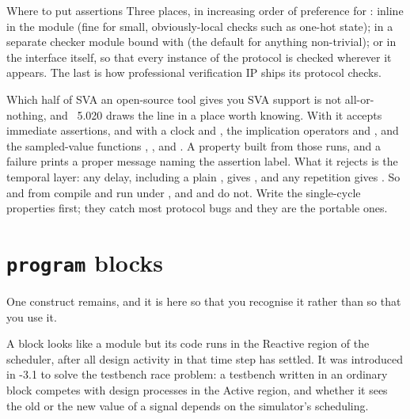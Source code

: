 \begin{notebox}{Where to put assertions}
Three places, in increasing order of preference for \RTL{}: inline in the
module (fine for small, obviously-local checks such as one-hot state);
in a separate checker module bound with  (the default for anything
non-trivial); or in the interface itself, so that every instance of the
protocol is checked wherever it appears. The last is how professional
verification IP ships its protocol checks.
\end{notebox}

\begin{notebox}{Which half of SVA an open-source tool gives you}
SVA support is not all-or-nothing, and ~5.020 draws the line
in a place worth knowing. With  it accepts immediate
assertions,  and  with a clock and
, the implication operators \code{|->} and \code{|=>}, and
the sampled-value functions , ,  and
. A property built from those runs, and a failure prints a
proper message naming the assertion label. What it rejects is the temporal
layer: any \code{\#\#} delay, including a plain , gives
, and any \code{[*n]}
repetition gives . So
 and  from
 compile and run under , and
 and  do not. Write the
single-cycle properties first; they catch most protocol bugs and they are the
portable ones.
\end{notebox}

\section{\texttt{program} blocks}
\label{sec:beyond:program}
\label{sec:toolkit:program}

One construct remains, and it is here so that you recognise it rather than so
that you use it.

A  block looks like a module but its code runs in the Reactive
region of the scheduler, after all design activity in that time step has
settled. It was introduced in \SV{}-3.1 to solve the testbench race problem:
a testbench written in an ordinary  block competes with design
processes in the Active region, and whether it sees the old or the new value
of a signal depends on the simulator's scheduling.

